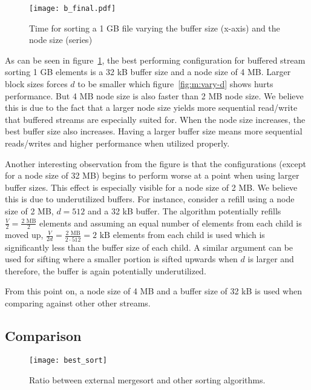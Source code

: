 \begin{figure}[h!]
  \centering
  \texttt{[image: b\_final.pdf]}
  \caption{Time for sorting a 1 GB file varying the buffer size (x-axis) and the node size (series)}
  \label{fig:b_final}
\end{figure}

As can be seen in figure~\ref{fig:b_final}, the best performing configuration for buffered stream sorting 1 GB elements is a 32 kB buffer size and a node size of 4 MB. Larger block sizes forces $d$ to be smaller which figure~\ref{fig:m:vary-d} shows hurts performance. But 4 MB node size is also faster than 2 MB node size. We believe this is due to the fact that a larger node size yields more sequential read/write that buffered streams are especially suited for. When the node size increases, the best buffer size also increases. Having a larger buffer size means more sequential reads/writes and higher performance when utilized properly.

Another interesting observation from the figure is that the configurations (except for a node size of 32 MB) begins to perform worse at a point when using larger buffer sizes. This effect is especially visible for a node size of 2 MB. We believe this is due to underutilized buffers. For instance, consider a refill using a node size of 2 MB, $d=512$ and a 32 kB buffer. The algorithm potentially refills $\frac{V}{2}=\frac{\textrm{2 MB}}{2}$ elements and assuming an equal number of elements from each child is moved up, $\frac{V}{2d}=\frac{\textrm{2 MB}}{2 \cdot 512}=\textrm{2 kB}$ elements from each child is used which is significantly less than the buffer size of each child. A similar argument can be used for sifting where a smaller portion is sifted upwards when $d$ is larger and therefore, the buffer is again potentially underutilized.

From this point on, a node size of 4 MB and a buffer size of 32 kB is used when comparing against other other streams.

\subsection{Comparison}

\begin{figure}
  \centering
  \texttt{[image: best\_sort]}
  \caption{Ratio between external mergesort and other sorting algorithms.}
  \label{fig:best_sort}
\end{figure}

